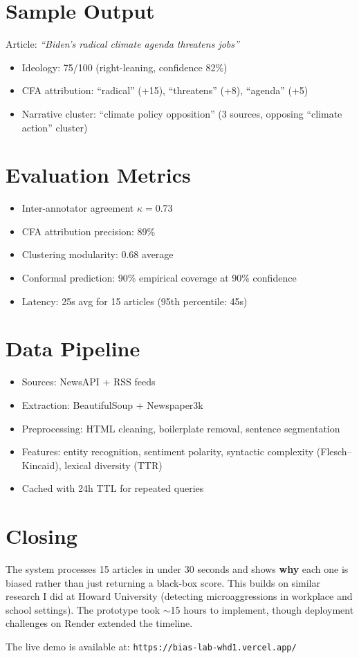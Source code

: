 \documentclass[12pt]{article}
\begin{document}
\section*{Sample Output}
Article: \textit{``Biden's radical climate agenda threatens jobs''}  
\begin{itemize}
  \item Ideology: 75/100 (right-leaning, confidence 82\%)
  \item CFA attribution: ``radical'' (+15), ``threatens'' (+8), ``agenda'' (+5)
  \item Narrative cluster: ``climate policy opposition'' (3 sources, opposing ``climate action'' cluster)
\end{itemize}

\section*{Evaluation Metrics}
\begin{itemize}
  \item Inter-annotator agreement $\kappa = 0.73$
  \item CFA attribution precision: 89\%
  \item Clustering modularity: 0.68 average
  \item Conformal prediction: 90\% empirical coverage at 90\% confidence
  \item Latency: 25s avg for 15 articles (95th percentile: 45s)
\end{itemize}

\section*{Data Pipeline}
\begin{itemize}
  \item Sources: NewsAPI + RSS feeds
  \item Extraction: BeautifulSoup + Newspaper3k
  \item Preprocessing: HTML cleaning, boilerplate removal, sentence segmentation
  \item Features: entity recognition, sentiment polarity, syntactic complexity (Flesch–Kincaid), lexical diversity (TTR)
  \item Cached with 24h TTL for repeated queries
\end{itemize}

\section*{Closing}
The system processes 15 articles in under 30 seconds and shows \textbf{why} each one is biased rather than just returning a black-box score. This builds on similar research I did at Howard University (detecting microaggressions in workplace and school settings). The prototype took $\sim$15 hours to implement, though deployment challenges on Render extended the timeline.  

The live demo is available at: \texttt{https://bias-lab-whd1.vercel.app/}
\end{document}

